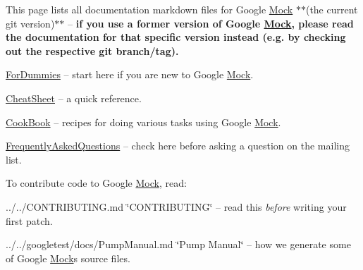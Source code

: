 This page lists all documentation markdown files for Google \mbox{\hyperlink{class_mock}{Mock}} $\ast$$\ast$(the current git version)$\ast$$\ast$ -- {\bfseries{if you use a former version of Google \mbox{\hyperlink{class_mock}{Mock}}, please read the documentation for that specific version instead (e.\+g. by checking out the respective git branch/tag).}}


\begin{DoxyItemize}
\item \mbox{\hyperlink{_obj__test_2lib_2googletest-release-1_88_81_2googlemock_2docs_2_for_dummies_8md}{For\+Dummies}} -- start here if you are new to Google \mbox{\hyperlink{class_mock}{Mock}}.
\item \mbox{\hyperlink{_obj__test_2lib_2googletest-release-1_88_81_2googlemock_2docs_2_cheat_sheet_8md}{Cheat\+Sheet}} -- a quick reference.
\item \mbox{\hyperlink{_obj__test_2lib_2googletest-release-1_88_81_2googlemock_2docs_2_cook_book_8md}{Cook\+Book}} -- recipes for doing various tasks using Google \mbox{\hyperlink{class_mock}{Mock}}.
\item \mbox{\hyperlink{_obj__test_2lib_2googletest-release-1_88_81_2googlemock_2docs_2_frequently_asked_questions_8md}{Frequently\+Asked\+Questions}} -- check here before asking a question on the mailing list.
\end{DoxyItemize}

To contribute code to Google \mbox{\hyperlink{class_mock}{Mock}}, read\+:


\begin{DoxyItemize}
\item ../../\+C\+O\+N\+T\+R\+I\+B\+U\+T\+I\+NG.md \char`\"{}\+C\+O\+N\+T\+R\+I\+B\+U\+T\+I\+N\+G\char`\"{} -- read this {\itshape before} writing your first patch.
\item ../../googletest/docs/\+Pump\+Manual.md \char`\"{}\+Pump Manual\char`\"{} -- how we generate some of Google \mbox{\hyperlink{class_mock}{Mock}}\textquotesingle{}s source files. 
\end{DoxyItemize}